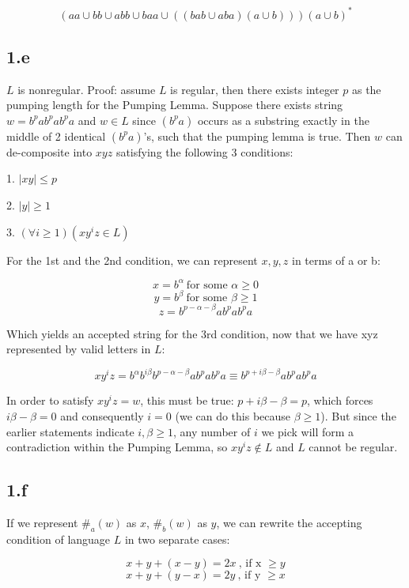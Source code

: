 \documentclass{article}
\begin{document}
$$(aa\cup bb\cup abb\cup baa\cup ((bab\cup aba)(a\cup b)))(a\cup b)^*$$

\subsection*{1.e}

$L$ is nonregular. Proof: assume $L$ is regular, then there exists integer $p$ as the pumping length for the Pumping Lemma. Suppose there exists string $w=b^pab^pab^pa$ and $w \in L$ since $(b^pa)$ occurs as a substring exactly in the middle of 2 identical $(b^pa)$'s, such that the pumping lemma is true. Then $w$ can de-composite into $xyz$ satisfying the following 3 conditions:

1. $|xy| \leq p$

2. $|y| \geq 1$

3. $(\forall i \geq 1)(xy^iz \in L)$

For the 1st and the 2nd condition, we can represent $x, y,z$ in terms of a or b:

\[x=b^{\alpha} \:\text{for some $\alpha \geq 0$}\]
$$y=b^{\beta}\: \text{for some $\beta \geq 1$}$$
$$ z=b^{p-\alpha-\beta}ab^pab^pa $$

Which yields an accepted string for the 3rd condition, now that we have xyz represented by valid letters in $L$:

$$ xy^iz=b^{\alpha}b^{i\beta}b^{p-\alpha-\beta}ab^pab^pa \equiv b^{p+i\beta-\beta}ab^pab^pa$$

In order to satisfy ${xy^iz = w}$, this must be true: $p+i\beta-\beta = p$, which forces $i\beta-\beta =0$ and consequently $i=0$ (we can do this because $\beta \geq 1$). But since the earlier statements indicate $i, \beta\geq 1$, any number of $i$ we pick will form a contradiction within the Pumping Lemma, so $xy^iz \not\in L$ and $L$ cannot be regular.

\subsection*{1.f}

If we represent $\#_a(w)$ as $x$, $\#_b(w)$ as $y$, we can rewrite the accepting condition of language $L$ in two separate cases:

$$x + y + (x-y) = 2x \: \text{, if x $\geq y$}$$
$$x + y + (y-x) = 2y \: \text{, if y $\geq x$}$$
\end{document}
